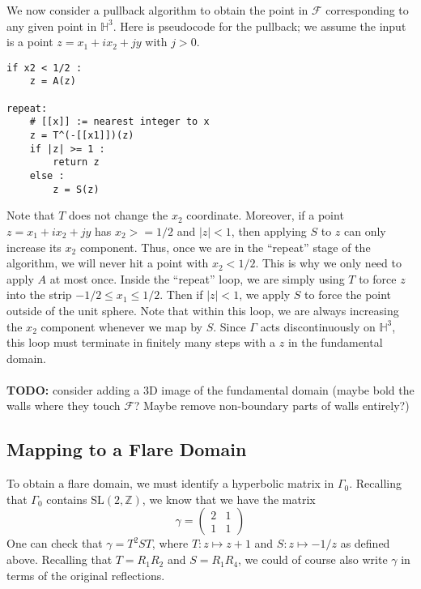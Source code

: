 \documentclass[]{article}
\begin{document}
We now consider a pullback algorithm to obtain the point in $\mathcal{F}$ corresponding to any given point in $\mathbb{H}^3$.
Here is pseudocode for the pullback; we assume the input is a point $z = x_1 + ix_2 + jy$ with $j > 0$.
\begin{verbatim}
if x2 < 1/2 :
    z = A(z)
    
repeat:
    # [[x]] := nearest integer to x
    z = T^(-[[x1]])(z)
    if |z| >= 1 :
        return z
    else :
        z = S(z)
\end{verbatim}
Note that $T$ does not change the $x_2$ coordinate.
Moreover, if a point $z = x_1 + ix_2 + jy$ has $x_2 >=1/2$ and $|z| < 1$, then applying $S$ to $z$ can only increase its $x_2$ component.
Thus, once we are in the ``repeat'' stage of the algorithm, we will never hit a point with $x_2 < 1/2$.
This is why we only need to apply $A$ at most once.
Inside the ``repeat'' loop, we are simply using $T$ to force $z$ into the strip $-1/2 \leq x_1 \leq 1/2$.
Then if $|z| < 1$, we apply $S$ to force the point outside of the unit sphere.
Note that within this loop, we are always increasing the $x_2$ component whenever we map by $S$.
Since $\Gamma$ acts discontinuously on $\mathbb{H}^3$, this loop must terminate in finitely many steps with a $z$ in the fundamental domain.
\\ \\
\textbf{TODO:} consider adding a 3D image of the fundamental domain (maybe bold the walls where they touch $\mathcal{F}$? Maybe remove non-boundary parts of walls entirely?)

\subsection*{Mapping to a Flare Domain}

To obtain a flare domain, we must identify a hyperbolic matrix in $\Gamma_0$.
Recalling that $\Gamma_0$ contains $\text{SL}(2, \mathbb{Z})$, we know that we have the matrix
$$
\gamma =
\begin{pmatrix}
	2 & 1 \\
	1 & 1
\end{pmatrix}
$$
One can check that $\gamma = T^2ST$, where $T: z \mapsto z + 1$ and $S: z \mapsto -1/z$ as defined above.
Recalling that $T = R_1R_2$ and $S = R_1R_4$, we could of course also write $\gamma$ in terms of the original reflections.
\end{document}
